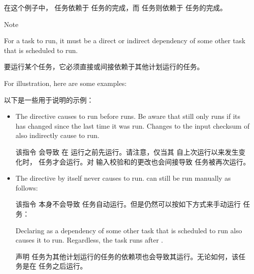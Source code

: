 在这个例子中， 任务依赖于  任务的完成，而  任务则依赖于  任务的完成。

\begin{noteblock}{Note}%

For a task to run, it must be a direct or indirect dependency of some other task that is scheduled to run.

\medskip
要运行某个任务，它必须直接或间接依赖于其他计划运行的任务。

\medskip
For illustration, here are some examples:

\medskip
以下是一些用于说明的示例：

\begin{itemize}
\setlength\itemsep{1.0em}

\item The directive  causes  to run before  runs. Be aware that  still only runs if its  has changed since the last time it was run. Changes to the input checksum of  also indirectly cause  to run.

\medskip
该指令  会导致  在  运行之前先运行。请注意，仅当其  自上次运行以来发生变化时， 任务才会运行。对   输入校验和的更改也会间接导致  任务被再次运行。

\item The directive  by itself never causes  to run.  can still be run manually as follows:

\medskip
该指令  本身不会导致  任务自动运行。但是仍然可以按如下方式来手动运行  任务：

\medskip
{}

\medskip
Declaring  as a dependency of some other task that is scheduled to run also causes it to run. Regardless, the task runs after .

\medskip
声明  任务为其他计划运行的任务的依赖项也会导致其运行。无论如何，该任务是在  任务之后运行。
\end{itemize}
\end{noteblock}


